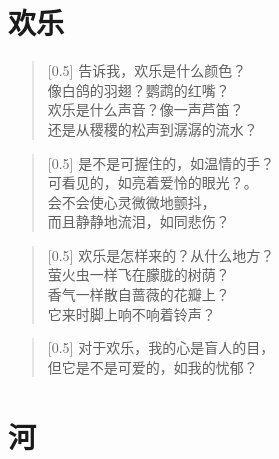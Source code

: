 \documentclass[12pt,UTF-8,openany]{ctexbook}
\begin{document}
\chapter{欢乐}

\begin{large}
    
    \begin{verse}[0.5\linewidth]
        告诉我，欢乐是什么颜色？ \\
        像白鸽的羽翅？鹦鹉的红嘴？ \\
        欢乐是什么声音？像一声芦笛？ \\
        还是从稷稷的松声到潺潺的流水？
    \end{verse}
    
    
    \begin{verse}[0.5\linewidth]
        是不是可握住的，如温情的手？ \\
        可看见的，如亮着爱怜的眼光？。 \\
        会不会使心灵微微地颤抖， \\
        而且静静地流泪，如同悲伤？
    \end{verse}
    
    
    \begin{verse}[0.5\linewidth]
        欢乐是怎样来的？从什么地方？ \\
        萤火虫一样飞在朦胧的树荫？ \\
        香气一样散自蔷薇的花瓣上？ \\
        它来时脚上响不响着铃声？
    \end{verse}
    
    
    \begin{verse}[0.5\linewidth]
        对于欢乐，我的心是盲人的目， \\
        但它是不是可爱的，如我的忧郁？
    \end{verse}
    
\end{large}



\chapter{河}
\end{document}
